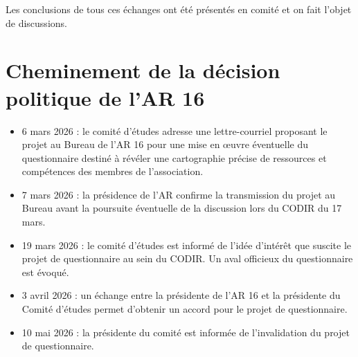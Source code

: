\documentclass[10pt,a4paper]{article}
\begin{document}
Les conclusions de tous ces échanges ont été présentés en comité et on fait l'objet de discussions.

\section{Cheminement de la décision politique de l'AR 16}

\begin{itemize}
    \item 6 mars 2026 : le comité d'études adresse une lettre-courriel proposant le projet au Bureau de l'AR 16 pour une mise en œuvre éventuelle du questionnaire destiné à révéler une cartographie précise de ressources et compétences des membres de l'association.

    \item 7 mars 2026 : la présidence de l'AR confirme la transmission du projet au Bureau avant la poursuite éventuelle de la discussion lors du CODIR du 17 mars.

    \item 19 mars 2026 : le comité d'études est informé de l'idée d'intérêt que suscite le projet de questionnaire au sein du CODIR. Un aval officieux du questionnaire est évoqué.

    \item  3 avril 2026 : un échange entre la présidente de l'AR 16 et la présidente du Comité d'études permet d'obtenir un accord pour le projet de questionnaire.

    \item 10 mai 2026 : la présidente du comité est informée de l'invalidation du projet de questionnaire.
\end{itemize}
\end{document}
